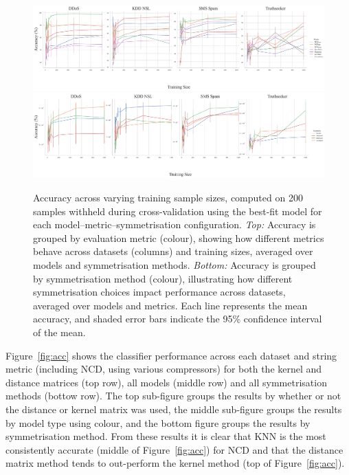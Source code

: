 \documentclass[preprint,12pt]{article}
\begin{document}
\begin{figure}[!bht]
    \centering
    \includegraphics[width=\textwidth]{images/accuracy_vs_sample_size_vs_metric.pdf}
    \hfill
    \includegraphics[width=\textwidth]{images/accuracy_vs_sample_size_vs_symmetric.pdf}
    \caption{
        Accuracy across varying training sample sizes, computed on 200 samples withheld during cross-validation using the best-fit model for each model–metric–symmetrisation configuration. \textit{Top:} Accuracy is grouped by evaluation metric (colour), showing how different metrics behave across datasets (columns) and training sizes, averaged over models and symmetrisation methods. \textit{Bottom:} Accuracy is grouped by symmetrisation method (colour), illustrating how different symmetrisation choices impact performance across datasets, averaged over models and metrics. Each line represents the mean accuracy, and shaded error bars indicate the 95\% confidence interval of the mean.
    }
    \label{fig:sample_size}
\end{figure}


Figure~\ref{fig:acc} shows the classifier performance across each dataset and string metric (including NCD, using various compressors) for both the kernel and distance matrices (top row), all models (middle row) and all symmetrisation methods (bottow row). 
The top sub-figure groups the results by whether or not the distance or kernel matrix was used, the middle sub-figure groups the results by model type using colour, and the bottom figure groups the results by symmetrisation method.
From these results it is clear that KNN is the most consistently accurate (middle of Figure~\ref{fig:acc}) for NCD and that the distance matrix method tends to out-perform the kernel method (top of Figure~\ref{fig:acc}).
\end{document}
